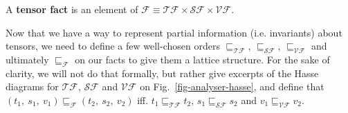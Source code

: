 \documentclass[11pt]{article}
\begin{document}
\begin{definition}
A \textbf{tensor fact} is an element of $\mathcal{F} \equiv \mathcal{TF} \times \mathcal{SF} \times \mathcal{VF}$.\\
\end{definition}

Now that we have a way to represent partial information (i.e. invariants) about tensors, we need to define a few well-chosen orders $\sqsubseteq_\mathcal{TF}$, $\sqsubseteq_\mathcal{SF}$, $\sqsubseteq_\mathcal{VF}$ and ultimately $\sqsubseteq_\mathcal{F}$ on our facts to give them a lattice structure. For the sake of clarity, we will not do that formally, but rather give excerpts of the Hasse diagrams for $\mathcal{TF}$, $\mathcal{SF}$ and $\mathcal{VF}$ on Fig.~\ref{fig-analyser-hasse}, and define that $(t_1,\ s_1,\ v_1) \sqsubseteq_\mathcal{F} (t_2,\ s_2,\ v_2)$ iff. $t_1 \sqsubseteq_\mathcal{TF} t_2$, $s_1 \sqsubseteq_\mathcal{SF} s_2$ and $v_1 \sqsubseteq_\mathcal{VF} v_2$.\\
\end{document}
